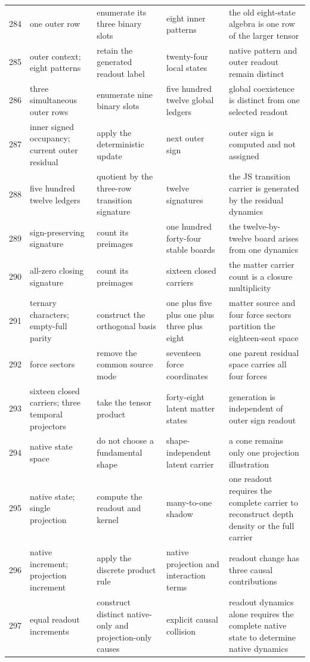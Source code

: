 \documentclass[11pt]{article}
\numberwithin{equation}{section}
\theoremstyle{remark}
\begin{document}
\begin{landscape}
\begin{longtable}{p{0.65cm}p{3.5cm}p{4.0cm}p{4.0cm}p{4.6cm}}
284&one outer row&enumerate its three binary slots&eight inner patterns&the old eight-state algebra is one row of the larger tensor\\
285&outer context; eight patterns&retain the generated readout label&twenty-four local states&native pattern and outer readout remain distinct\\
286&three simultaneous outer rows&enumerate nine binary slots&five hundred twelve global ledgers&global coexistence is distinct from one selected readout\\
287&inner signed occupancy; current outer residual&apply the deterministic update&next outer sign&outer sign is computed and not assigned\\
288&five hundred twelve ledgers&quotient by the three-row transition signature&twelve signatures&the JS transition carrier is generated by the residual dynamics\\
289&sign-preserving signature&count its preimages&one hundred forty-four stable boards&the twelve-by-twelve board arises from one dynamics\\
290&all-zero closing signature&count its preimages&sixteen closed carriers&the matter carrier count is a closure multiplicity\\
291&ternary characters; empty-full parity&construct the orthogonal basis&one plus five plus one plus three plus eight&matter source and four force sectors partition the eighteen-seat space\\
292&force sectors&remove the common source mode&seventeen force coordinates&one parent residual space carries all four forces\\
293&sixteen closed carriers; three temporal projectors&take the tensor product&forty-eight latent matter states&generation is independent of outer sign readout\\
294&native state space&do not choose a fundamental shape&shape-independent latent carrier&a cone remains only one projection illustration\\
295&native state; single projection&compute the readout and kernel&many-to-one shadow&one readout requires the complete carrier to reconstruct depth density or the full carrier\\
296&native increment; projection increment&apply the discrete product rule&native projection and interaction terms&readout change has three causal contributions\\
297&equal readout increments&construct distinct native-only and projection-only causes&explicit causal collision&readout dynamics alone requires the complete native state to determine native dynamics\\

\end{longtable}
\end{landscape}
\end{document}
